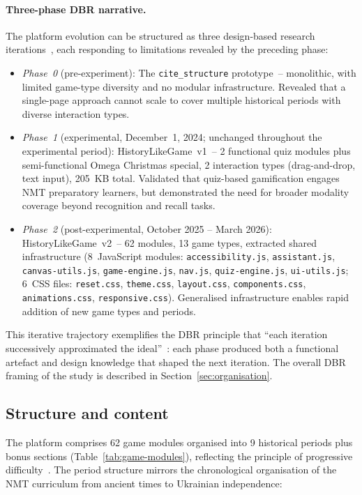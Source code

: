\paragraph{Three-phase DBR narrative.}
The platform evolution can be structured as three design-based research iterations~\cite{Bakker2018}, each responding to limitations revealed by the preceding phase:
\begin{itemize}
\item \emph{Phase~0} (pre-experiment): The \texttt{cite\_structure} prototype~-- monolithic, with limited game-type diversity and no modular infrastructure. Revealed that a single-page approach cannot scale to cover multiple historical periods with diverse interaction types.
\item \emph{Phase~1} (experimental, December~1, 2024; unchanged throughout the experimental period): HistoryLikeGame~v1~-- 2 functional quiz modules plus semi-functional Omega Christmas special, 2 interaction types (drag-and-drop, text input), 205~KB total. Validated that quiz-based gamification engages NMT preparatory learners, but demonstrated the need for broader modality coverage beyond recognition and recall tasks.
\item \emph{Phase~2} (post-experimental, October 2025 -- March 2026): HistoryLikeGame~v2~-- 62 modules, 13 game types, extracted shared infrastructure (8~JavaScript modules: \texttt{accessibility.js}, \texttt{assistant.js}, \texttt{canvas-utils.js}, \texttt{game-engine.js}, \texttt{nav.js}, \texttt{quiz-engine.js}, \texttt{ui-utils.js}; 6~CSS files: \texttt{reset.css}, \texttt{theme.css}, \texttt{layout.css}, \texttt{components.css}, \texttt{animations.css}, \texttt{responsive.css}). Generalised infrastructure enables rapid addition of new game types and periods.
\end{itemize}
This iterative trajectory exemplifies the DBR principle that ``each iteration successively approximated the ideal''~\cite{Bakker2018}: each phase produced both a functional artefact and design knowledge that shaped the next iteration. The overall DBR framing of the study is described in Section~\ref{sec:organisation}.

\subsection{Structure and content}

The platform comprises 62 game modules organised into 9 historical periods plus bonus sections (Table~\ref{tab:game-modules}), reflecting the principle of progressive difficulty~\cite{Clark2016, Connolly2012}. The period structure mirrors the chronological organisation of the NMT curriculum from ancient times to Ukrainian independence:

